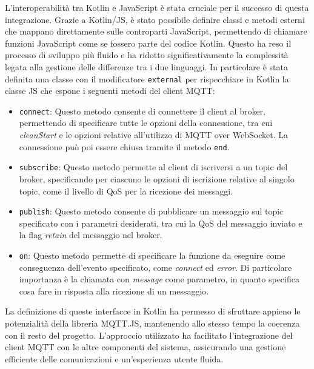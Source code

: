 \documentclass[12pt,a4paper,openright,twoside]{book}
\begin{document}
L'interoperabilità tra Kotlin e JavaScript è stata cruciale per il successo di questa integrazione. Grazie a Kotlin/JS, è stato possibile definire classi e metodi esterni 
che mappano direttamente sulle controparti JavaScript, permettendo di chiamare funzioni JavaScript come se fossero parte del codice Kotlin. Questo ha reso il processo di 
sviluppo più fluido e ha ridotto significativamente la complessità legata alla gestione delle differenze tra i due linguaggi.
In particolare è stata definita una classe con il modificatore \texttt{external} per rispecchiare in Kotlin la classe \ac{JS} che espone 
i seguenti metodi del client \ac{MQTT}:
\begin{itemize}
    \item \texttt{connect}: Questo metodo consente di connettere il client al broker, permettendo di specificare tutte le opzioni della connessione, 
    tra cui \textit{cleanStart} e le opzioni relative all'utilizzo di \ac{MQTT} over WebSocket. La connessione può poi essere chiusa tramite il metodo \texttt{end}.
    
    \item \texttt{subscribe}: Questo metodo permette al client di iscriversi a un topic del broker, specificando per ciascuno le opzioni di iscrizione 
    relative al singolo topic, come il livello di \ac{QoS} per la ricezione dei messaggi.
    
    \item \texttt{publish}: Questo metodo consente di pubblicare un messaggio sul topic specificato con i parametri desiderati, tra cui la \ac{QoS} del messaggio 
    inviato e la flag \textit{retain} del messaggio nel broker.
    
    \item \texttt{on}: Questo metodo permette di specificare la funzione da eseguire come conseguenza dell'evento specificato, come \textit{connect} ed \textit{error}. 
    Di particolare importanza è la chiamata con \textit{message} come parametro, in quanto specifica cosa fare in risposta alla ricezione di un messaggio.
\end{itemize}

La definizione di queste interfacce in Kotlin ha permesso di sfruttare appieno le potenzialità della libreria MQTT.JS, mantenendo allo stesso tempo la coerenza con il 
resto del progetto. L'approccio utilizzato ha facilitato l'integrazione del client \ac{MQTT} con le altre componenti del sistema, assicurando una gestione efficiente 
delle comunicazioni e un'esperienza utente fluida.
\pa
\end{document}
